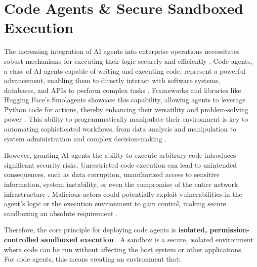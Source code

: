 \section{Code Agents \& Secure Sandboxed Execution}

The increasing integration of AI agents into enterprise operations necessitates robust mechanisms for executing their logic securely and efficiently \cite{Reger2026}. Code agents, a class of AI agents capable of writing and executing code, represent a powerful advancement, enabling them to directly interact with software systems, databases, and APIs to perform complex tasks \cite{AgentsCourse}. Frameworks and libraries like Hugging Face's Smolagents showcase this capability, allowing agents to leverage Python code for actions, thereby enhancing their versatility and problem-solving power \cite{HuggingFaceSmolagents}. This ability to programmatically manipulate their environment is key to automating sophisticated workflows, from data analysis and manipulation to system administration and complex decision-making \cite{AgentsCourse}.

However, granting AI agents the ability to execute arbitrary code introduces significant security risks. Unrestricted code execution can lead to unintended consequences, such as data corruption, unauthorized access to sensitive information, system instability, or even the compromise of the entire network infrastructure \cite{Reger2026}. Malicious actors could potentially exploit vulnerabilities in the agent's logic or the execution environment to gain control, making secure sandboxing an absolute requirement \cite{AgentsCourse}.

Therefore, the core principle for deploying code agents is \textbf{isolated, permission-controlled sandboxed execution} \cite{Reger2026}. A sandbox is a secure, isolated environment where code can be run without affecting the host system or other applications. For code agents, this means creating an environment that:

